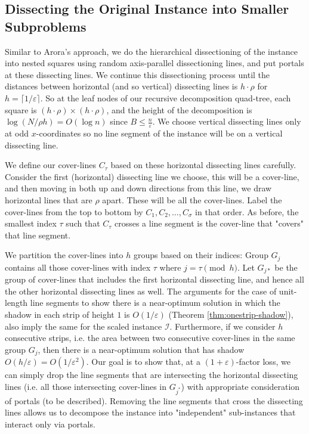 \documentclass[10pt,a4paper]{amsart}
\theoremstyle{thmstyleone}
\newcommand{\eps}{\varepsilon}
\begin{document}
\subsection{Dissecting the Original Instance into Smaller Subproblems}\label{sec:dissection}

Similar to Arora's approach, we do the hierarchical dissectioning of the instance into nested squares using random axis-parallel dissectioning lines, and put portals at these dissecting lines. We continue this dissectioning process until the distances between horizontal (and so vertical) dissecting lines is $h\cdot\rho$ for $h=\lceil 1/\eps\rceil$. So at the leaf nodes of our recursive decomposition quad-tree, each square is $(h\cdot\rho)\times (h\cdot\rho)$, and the height of the decomposition is $\log (N/\rho h)=O(\log n)$ since $B\leq\frac{n}{\eps}$. We choose vertical dissecting lines only at odd $x$-coordinates so no line segment of the instance will be on a vertical dissecting line.

We define our cover-lines $C_\tau$ based on these horizontal dissecting lines carefully.
Consider the first (horizontal) dissecting line we choose, this will be a cover-line, and then moving in both up and down directions from this line, we draw horizontal lines that are $\rho$ apart. These will be all the cover-lines.
Label the cover-lines from the top to bottom by $C_1, C_2,\dots, C_\sigma$ in that order. As before, the smallest index $\tau$ such that $C_\tau$ crosses a line segment is the cover-line that "covers" that line segment. 

We partition the cover-lines into $h$ groups based on their indices: Group $G_j$ contains all those cover-lines with index $\tau$ where $j=\tau \pmod h$.
Let $G_{j*}$ be the group of cover-lines that includes the first horizontal dissecting line, and hence all the other horizontal dissecting lines as well.
The arguments for the case of unit-length line segments to show there is a near-optimum solution in which the shadow in each strip of height $1$ is $O(1/\eps)$ (Theorem \ref{thm:onestrip-shadow}), also imply the same for the scaled instance $\mathcal I$. Furthermore, if we consider $h$
consecutive strips, i.e. the area between two consecutive cover-lines in the same group $ G_j $,
then there is a near-optimum solution that has shadow $O(h/\eps)=O(1/\eps^2)$.
Our goal is to show that, at a $(1+\eps)$-factor loss, we can simply drop the line segments that are intersecting the horizontal dissecting lines (i.e. all those intersecting cover-lines in $G_{j^*}$) with appropriate 
consideration of portals (to be described). Removing the line segments that cross the dissecting lines allows us to decompose the instance into "independent" sub-instances that interact only via portals.
\end{document}
